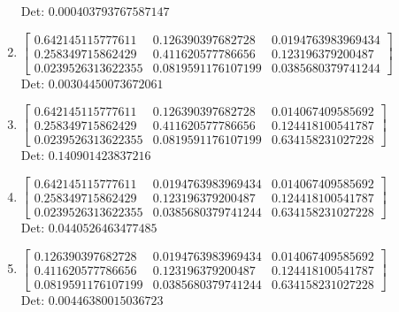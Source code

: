 \documentclass[12pt]{article}
\begin{document}
\begin{enumerate}
Det: $0.000403793767587147$\\

\item $\displaystyle \left[\begin{matrix}0.642145115777611 & 0.126390397682728 & 0.0194763983969434\\0.258349715862429 & 0.411620577786656 & 0.123196379200487\\0.0239526313622355 & 0.0819591176107199 & 0.0385680379741244\end{matrix}\right]$\\

Det: $0.00304450073672061$\\

\item $\displaystyle \left[\begin{matrix}0.642145115777611 & 0.126390397682728 & 0.014067409585692\\0.258349715862429 & 0.411620577786656 & 0.124418100541787\\0.0239526313622355 & 0.0819591176107199 & 0.634158231027228\end{matrix}\right]$\\

Det: $0.140901423837216$\\

\item $\displaystyle \left[\begin{matrix}0.642145115777611 & 0.0194763983969434 & 0.014067409585692\\0.258349715862429 & 0.123196379200487 & 0.124418100541787\\0.0239526313622355 & 0.0385680379741244 & 0.634158231027228\end{matrix}\right]$\\

Det: $0.0440526463477485$\\

\item $\displaystyle \left[\begin{matrix}0.126390397682728 & 0.0194763983969434 & 0.014067409585692\\0.411620577786656 & 0.123196379200487 & 0.124418100541787\\0.0819591176107199 & 0.0385680379741244 & 0.634158231027228\end{matrix}\right]$\\

Det: $0.00446380015036723$\\


\end{enumerate}
\end{document}
